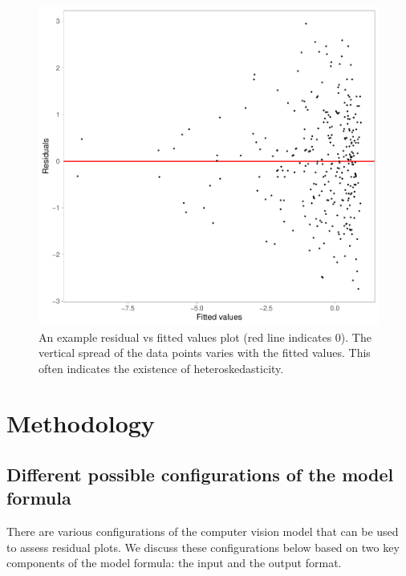 \documentclass[]{interact}
\theoremstyle{plain}%
\theoremstyle{definition}
\theoremstyle{remark}
\begin{document}
\begin{figure}[!h]

{\centering \includegraphics[width=1\linewidth]{paper_files/figure-latex/false-finding-1} 

}

\caption{An example residual vs fitted values plot (red line indicates 0). The vertical spread of the data points varies with the fitted values. This often indicates the existence of heteroskedasticity.}\label{fig:false-finding}
\end{figure}

\hypertarget{methodology}{%
\section{Methodology}\label{methodology}}

\hypertarget{different-possible-configurations-of-the-model-formula}{%
\subsection{Different possible configurations of the model
formula}\label{different-possible-configurations-of-the-model-formula}}

There are various configurations of the computer vision model that can
be used to assess residual plots. We discuss these configurations below
based on two key components of the model formula: the input and the
output format.
\end{document}
